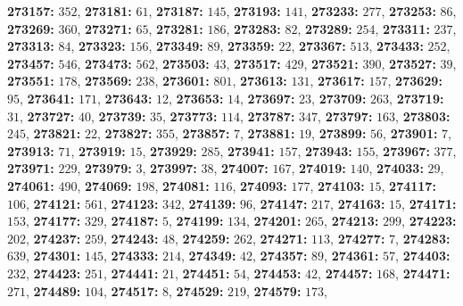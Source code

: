\textsf{\bfseries 273157:} $352$, \textsf{\bfseries 273181:} $61$, \textsf{\bfseries 273187:} $145$, \textsf{\bfseries 273193:} $141$, \textsf{\bfseries 273233:} $277$, \textsf{\bfseries 273253:} $86$, \textsf{\bfseries 273269:} $360$, \textsf{\bfseries 273271:} $65$, \textsf{\bfseries 273281:} $186$, \textsf{\bfseries 273283:} $82$, \textsf{\bfseries 273289:} $254$, \textsf{\bfseries 273311:} $237$, \textsf{\bfseries 273313:} $84$, \textsf{\bfseries 273323:} $156$, \textsf{\bfseries 273349:} $89$, \textsf{\bfseries 273359:} $22$, \textsf{\bfseries 273367:} $513$, \textsf{\bfseries 273433:} $252$, \textsf{\bfseries 273457:} $546$, \textsf{\bfseries 273473:} $562$, \textsf{\bfseries 273503:} $43$, \textsf{\bfseries 273517:} $429$, \textsf{\bfseries 273521:} $390$, \textsf{\bfseries 273527:} $39$, \textsf{\bfseries 273551:} $178$, \textsf{\bfseries 273569:} $238$, \textsf{\bfseries 273601:} $801$, \textsf{\bfseries 273613:} $131$, \textsf{\bfseries 273617:} $157$, \textsf{\bfseries 273629:} $95$, \textsf{\bfseries 273641:} $171$, \textsf{\bfseries 273643:} $12$, \textsf{\bfseries 273653:} $14$, \textsf{\bfseries 273697:} $23$, \textsf{\bfseries 273709:} $263$, \textsf{\bfseries 273719:} $31$, \textsf{\bfseries 273727:} $40$, \textsf{\bfseries 273739:} $35$, \textsf{\bfseries 273773:} $114$, \textsf{\bfseries 273787:} $347$, \textsf{\bfseries 273797:} $163$, \textsf{\bfseries 273803:} $245$, \textsf{\bfseries 273821:} $22$, \textsf{\bfseries 273827:} $355$, \textsf{\bfseries 273857:} $7$, \textsf{\bfseries 273881:} $19$, \textsf{\bfseries 273899:} $56$, \textsf{\bfseries 273901:} $7$, \textsf{\bfseries 273913:} $71$, \textsf{\bfseries 273919:} $15$, \textsf{\bfseries 273929:} $285$, \textsf{\bfseries 273941:} $157$, \textsf{\bfseries 273943:} $155$, \textsf{\bfseries 273967:} $377$, \textsf{\bfseries 273971:} $229$, \textsf{\bfseries 273979:} $3$, \textsf{\bfseries 273997:} $38$, \textsf{\bfseries 274007:} $167$, \textsf{\bfseries 274019:} $140$, \textsf{\bfseries 274033:} $29$, \textsf{\bfseries 274061:} $490$, \textsf{\bfseries 274069:} $198$, \textsf{\bfseries 274081:} $116$, \textsf{\bfseries 274093:} $177$, \textsf{\bfseries 274103:} $15$, \textsf{\bfseries 274117:} $106$, \textsf{\bfseries 274121:} $561$, \textsf{\bfseries 274123:} $342$, \textsf{\bfseries 274139:} $96$, \textsf{\bfseries 274147:} $217$, \textsf{\bfseries 274163:} $15$, \textsf{\bfseries 274171:} $153$, \textsf{\bfseries 274177:} $329$, \textsf{\bfseries 274187:} $5$, \textsf{\bfseries 274199:} $134$, \textsf{\bfseries 274201:} $265$, \textsf{\bfseries 274213:} $299$, \textsf{\bfseries 274223:} $202$, \textsf{\bfseries 274237:} $259$, \textsf{\bfseries 274243:} $48$, \textsf{\bfseries 274259:} $262$, \textsf{\bfseries 274271:} $113$, \textsf{\bfseries 274277:} $7$, \textsf{\bfseries 274283:} $639$, \textsf{\bfseries 274301:} $145$, \textsf{\bfseries 274333:} $214$, \textsf{\bfseries 274349:} $42$, \textsf{\bfseries 274357:} $89$, \textsf{\bfseries 274361:} $57$, \textsf{\bfseries 274403:} $232$, \textsf{\bfseries 274423:} $251$, \textsf{\bfseries 274441:} $21$, \textsf{\bfseries 274451:} $54$, \textsf{\bfseries 274453:} $42$, \textsf{\bfseries 274457:} $168$, \textsf{\bfseries 274471:} $271$, \textsf{\bfseries 274489:} $104$, \textsf{\bfseries 274517:} $8$, \textsf{\bfseries 274529:} $219$, \textsf{\bfseries 274579:} $173$, 
